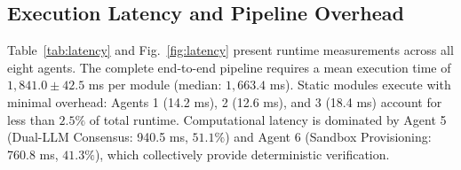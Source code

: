\documentclass[runningheads]{llncs}
\begin{document}
\begin{table}[t]
\centering
\caption{Remediation Validation Rates Across 1,000 Injected Defects (Mean $\pm$ 1SD over 5 Runs).}
\label{tab:remediation}
\setlength{\tabcolsep}{3.5pt}
\end{table}

\subsection{Execution Latency and Pipeline Overhead}
Table~\ref{tab:latency} and Fig.~\ref{fig:latency} present runtime measurements across all eight agents. The complete end-to-end pipeline requires a mean execution time of $1,841.0 \pm 42.5$ ms per module (median: $1,663.4$ ms). Static modules execute with minimal overhead: Agents 1 (14.2 ms), 2 (12.6 ms), and 3 (18.4 ms) account for less than $2.5\%$ of total runtime. Computational latency is dominated by Agent 5 (Dual-LLM Consensus: 940.5 ms, $51.1\%$) and Agent 6 (Sandbox Provisioning: 760.8 ms, $41.3\%$), which collectively provide deterministic verification.
\end{document}
